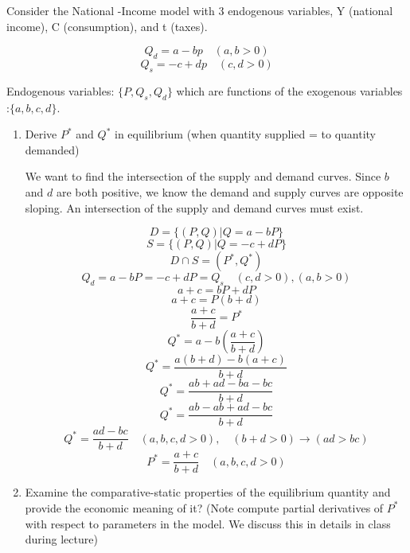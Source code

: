\documentclass[12pt]{article}
\newcounter{ques}
\newenvironment{question}{\stepcounter{ques}{\noindent\bf Question \arabic{ques}:}}{\vspace{5mm}}
\begin{document}
\begin{question}
      Consider the National -Income model with 3 endogenous variables, Y (national income), C (consumption), and t (taxes).

      $$Q_d = a-bp \quad (a, b> 0)$$
      $$Q_s = -c +dp \quad (c, d > 0)$$

      Endogenous variables:  $\{P, Q_s, Q_d\}$ which are functions of the exogenous variables :$\{a,b,c,d\}$.
     


      \begin{enumerate}[label=(\alph*)]
            \item Derive $P^*$ and $Q^*$ in equilibrium (when quantity supplied = to quantity demanded)
      
            We want to find the intersection of the supply and demand curves. Since $b$ and $d$ are both positive, we know the demand 
            and supply curves are opposite sloping. An intersection of the supply and demand curves must exist.

            $$D = \{(P,Q) | Q = a-bP\} $$
            $$S = \{(P,Q) | Q = -c +dP\} $$
            $$D \cap S = (P^*, Q^*)$$
            $$  Q_d = a-bP = -c +dP = Q_s \quad (c, d > 0), (a, b > 0)$$
            $$   a + c = bP +dP  $$
            $$   a + c = P(b +d)  $$
            $$   \frac{a + c}{b +d} = P^* $$
            $$ Q^* = a-b\left(\frac{a + c}{b +d}\right) $$
            $$ Q^* = \frac{a(b + d) - b(a + c)}{b +d} $$
            $$ Q^* = \frac{ab +ad - ba - bc}{b +d} $$
            $$ Q^* = \frac{ab - ab +ad - bc}{b +d} $$
            $$ Q^* = \frac{ad - bc}{b +d} \quad (a, b, c, d > 0),\quad (b+d > 0) \rightarrow (ad > bc)$$
            $$  P^* = \frac{a + c}{b +d}  \quad (a, b, c, d > 0)$$

            \item Examine the comparative-static properties of the equilibrium quantity and provide the economic meaning
            of it? (Note compute partial derivatives 
            of $P^*$ with respect to parameters in the model. We discuss this in details in class during lecture)


\end{enumerate}
\end{question}
\end{document}
